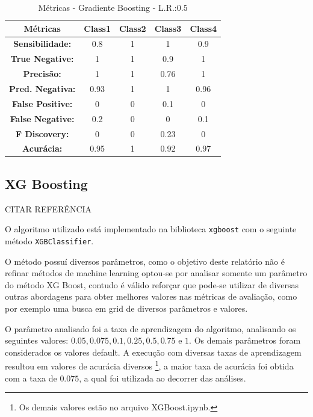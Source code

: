 \documentclass[
	article,			%
	11pt,				%
	oneside,			%
	a4paper,			%
	english,			%
	brazil,				%
	sumario=tradicional
	]{abntex2}
\begin{document}
\begin{table}[]
\centering
\begin{tabular}{|c|c|c|c|c|}
\hline
\textbf{Métricas}        & \textbf{Class1} & \textbf{Class2} & \textbf{Class3} & \textbf{Class4} \\ \hline
\textbf{Sensibilidade:}  & 0.8             & 1               & 1               & 0.9             \\ \hline
\textbf{True Negative:}  & 1               & 1               & 0.9             & 1               \\ \hline
\textbf{Precisão:}       & 1               & 1               & 0.76            & 1               \\ \hline
\textbf{Pred. Negativa:} & 0.93            & 1               & 1               & 0.96            \\ \hline
\textbf{False Positive:} & 0               & 0               & 0.1             & 0               \\ \hline
\textbf{False Negative:} & 0.2             & 0               & 0               & 0.1             \\ \hline
\textbf{F Discovery:}    & 0               & 0               & 0.23            & 0               \\ \hline
\textbf{Acurácia:}       & 0.95            & 1               & 0.92            & 0.97            \\ \hline
\end{tabular}
\caption{Métricas - Gradiente Boosting - L.R.:$0.5$}
\label{tab:metrics_gb}
\end{table}

\subsection{XG Boosting}

CITAR REFERÊNCIA

O algoritmo utilizado está implementado na biblioteca \verb|xgboost| com o seguinte método \verb|XGBClassifier|. 

O método possuí diversos parâmetros, como o objetivo deste relatório não é refinar métodos de machine learning optou-se por analisar somente um parâmetro do método XG Boost, contudo é válido reforçar que pode-se utilizar de diversas outras abordagens para obter melhores valores nas métricas de avaliação, como por exemplo uma busca em grid de diversos parâmetros e valores.

O parâmetro analisado foi a taxa de aprendizagem do algoritmo, analisando os seguintes valores: $0.05, 0.075, 0.1, 0.25, 0.5, 0.75$ e $1$. Os demais parâmetros foram considerados os valores default. A execução com diversas taxas de aprendizagem resultou em valores de acurácia diversos 
\footnote{Os demais valores estão no arquivo XGBoost.ipynb.}, a maior taxa de acurácia foi obtida com a taxa de $0.075$, a qual foi utilizada ao decorrer das análises. 
\end{document}

